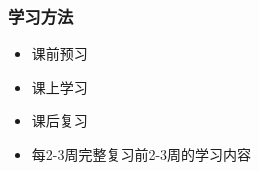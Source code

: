 \begin{frame}
	\frametitle{学习方法}
	\begin{itemize}[<+-|alert@+>]
		\item 课前预习
		\item 课上学习
		\item 课后复习
		\item 每2-3周完整复习前2-3周的学习内容
	\end{itemize}
\end{frame}






%
%



